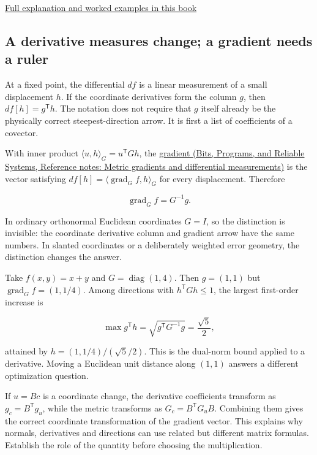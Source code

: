 \hyperref[02-foundations-ii-ch021-multivariable-derivatives-and-sensitivity-1]{Full explanation and worked examples in this book}

\subsection{A derivative measures change; a gradient needs a ruler}\label{01-foundations-i-ch018-a-derivative-measures-change-a-gradient-needs-a-ruler}

At a fixed point, the differential \(df\) is a linear measurement of a small displacement \(h\). If the coordinate derivatives form the column \(g\), then \(df[h]=g^{\mathsf T}h\). The notation does not require that \(g\) itself already be the physically correct steepest-direction arrow. It is first a list of coefficients of a covector.

With inner product \(\langle u,h\rangle_G=u^{\mathsf T}Gh\), the \href{../01-Bits-Programs-and-Reliable-Systems/main.pdf\#nameddest=appendix-f4acdb1d5563}{gradient (Bits, Programs, and Reliable Systems, Reference notes: Metric gradients and differential measurements)} is the vector satisfying \(df[h]=\langle\operatorname{grad}_G f,h\rangle_G\) for every displacement. Therefore

\[
\operatorname{grad}_G f=G^{-1}g.
\]

In ordinary orthonormal Euclidean coordinates \(G=I\), so the distinction is invisible: the coordinate derivative column and gradient arrow have the same numbers. In slanted coordinates or a deliberately weighted error geometry, the distinction changes the answer.

Take \(f(x,y)=x+y\) and \(G=\operatorname{diag}(1,4)\). Then \(g=(1,1)\) but \(\operatorname{grad}_Gf=(1,1/4)\). Among directions with \(h^{\mathsf T}Gh\le1\), the largest first-order increase is

\[
\max g^{\mathsf T}h=\sqrt{g^{\mathsf T}G^{-1}g}=\frac{\sqrt5}{2},
\]

attained by \(h=(1,1/4)/(\sqrt5/2)\). This is the dual-norm bound applied to a derivative. Moving a Euclidean unit distance along \((1,1)\) answers a different optimization question.

If \(u=Bc\) is a coordinate change, the derivative coefficients transform as \(g_c=B^{\mathsf T}g_u\), while the metric transforms as \(G_c=B^{\mathsf T}G_uB\). Combining them gives the correct coordinate transformation of the gradient vector. This explains why normals, derivatives and directions can use related but different matrix formulas. Establish the role of the quantity before choosing the multiplication.

